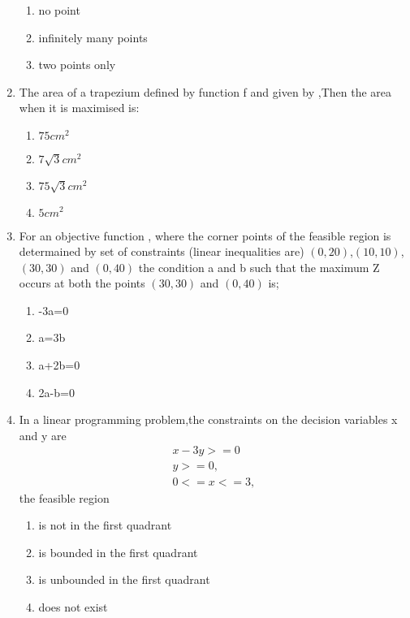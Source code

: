 \documentclass{article}
\begin{document}
\begin{enumerate}
\begin{enumerate}[label = (\Alph*)]
			\item no point
			\item infinitely many points
			\item two points only
		\end{enumerate}
	\item The area of a trapezium  defined by function f and given by ,Then the area when it is maximised is:
		\begin{enumerate}[label=(\Alph*)]
			\item $75cm^2$
			\item $7\sqrt{3}cm^2$
			\item $75\sqrt{3}cm^2$
			\item $5cm^2$
		\end{enumerate}
	\item For an objective function , where  the corner points of the feasible region is determained by set of constraints (linear inequalities are) $(0,20)$,$(10,10)$,$(30,30)$ and $(0,40)$ the condition a and b such that the maximum Z occurs at both the points $(30,30)$ and $(0,40)$ is;
		\begin{enumerate}[label=(\Alph*)]
			\item 
				-3a=0
			\item 
				a=3b
			\item 
				a+2b=0
			\item 
				2a-b=0
		\end{enumerate}
	\item In a linear programming problem,the constraints on the decision variables x and y are 
		\begin{align}
		    x-3y>=0
		   \\ y>=0,
		   \\ 0<=x<=3,
		\end{align}
		the feasible region 
		\begin{enumerate}[label=(\Alph*)]
			\item is not in the first quadrant
			\item is bounded in the first quadrant
			\item is unbounded in the first quadrant
			\item does not exist
		\end{enumerate}
 \end{enumerate}
 
\end{document}

